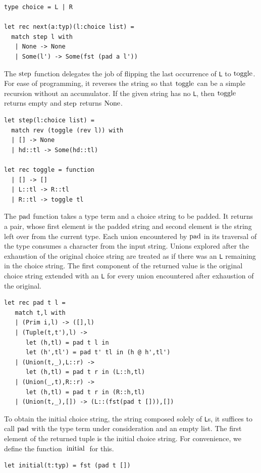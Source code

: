\documentclass[a4paper,english]{lipics-v2019}
\renewcommand{\L}{{\tt L}\xspace}
\newcommand{\Ls}{{\tt L}s\xspace}
\renewcommand{\c}[1]{\ensuremath{\text{\lstinline{#1}}}\xspace}
\begin{document}
\begin{lstlisting}
type choice = L | R

let rec next(a:typ)(l:choice list) = 
  match step l with
   | None -> None
   | Some(l') -> Some(fst (pad a l'))
\end{lstlisting}
\newpage

\noindent
The \c{step} function delegates the job of flipping the last occurrence of
\L to \c{toggle}. For ease of programming, it reverses the string so that
\c{toggle} can be a simple recursion without an accumulator.  If the given
string has no \L, then \c{toggle} returns empty and \c{step} returns
\c{None}.

\begin{lstlisting}
let step(l:choice list) =
  match rev (toggle (rev l)) with
  | [] -> None
  | hd::tl -> Some(hd::tl)

let rec toggle = function
  | [] -> []    
  | L::tl -> R::tl
  | R::tl -> toggle tl
\end{lstlisting}

\noindent The \c{pad} function takes a type term and a choice string to be
padded. It returns a pair, whose first element is the padded string and second
element is the string left over from the current type. Each union encountered
by \c{pad} in its traversal of the type consumes a character from the input
string. Unions explored after the exhaustion of the original choice string are
treated as if there was an \L remaining in the choice string. The first
component of the returned value is the original choice string
extended with an \L for every union encountered after exhaustion of the original.

\begin{lstlisting}
let rec pad t l =
   match t,l with
   | (Prim i,l) -> ([],l)
   | (Tuple(t,t'),l) -> 
      let (h,tl) = pad t l in
      let (h',tl') = pad t' tl in (h @ h',tl')
   | (Union(t,_),L::r) -> 
      let (h,tl) = pad t r in (L::h,tl)
   | (Union(_,t),R::r) -> 
      let (h,tl) = pad t r in (R::h,tl)
   | (Union(t,_),[]) -> (L::(fst(pad t [])),[])
\end{lstlisting}

\noindent
To obtain the initial choice string, the string composed solely of \Ls, it
suffices to call \c{pad} with the type term under consideration and an empty
list. The first element of the returned tuple is the initial choice
string. For convenience, we define the function \c{initial} for this.

\begin{lstlisting}
let initial(t:typ) = fst (pad t [])
\end{lstlisting}
\end{document}
